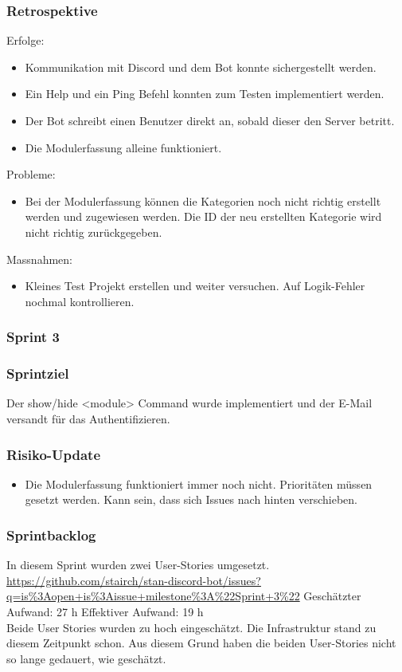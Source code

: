 \documentclass[a4paper, table]{article}
\begin{document}
\subsubsection*{Retrospektive}
Erfolge:
\begin{itemize}
    \item Kommunikation mit Discord und dem Bot konnte sichergestellt werden.
    \item Ein Help und ein Ping Befehl konnten zum Testen implementiert werden.
    \item Der Bot schreibt einen Benutzer direkt an, sobald dieser den Server betritt.
    \item Die Modulerfassung alleine funktioniert.
\end{itemize}
Probleme:
\begin{itemize}
    \item Bei der Modulerfassung können die Kategorien noch nicht richtig erstellt werden und zugewiesen werden.
    Die ID der neu erstellten Kategorie wird nicht richtig zurückgegeben.
\end{itemize}
Massnahmen:
\begin{itemize}
    \item Kleines Test Projekt erstellen und weiter versuchen. Auf Logik-Fehler nochmal kontrollieren.
\end{itemize}
\newpage

\subsubsection{Sprint 3}
\subsubsection*{Sprintziel}
Der show/hide <module> Command wurde implementiert und der E-Mail versandt für das Authentifizieren.

\subsubsection*{Risiko-Update}
\begin{itemize}
    \item Die Modulerfassung funktioniert immer noch nicht.
    Prioritäten müssen gesetzt werden.
    Kann sein, dass sich Issues nach hinten verschieben.
\end{itemize}

\subsubsection*{Sprintbacklog}
In diesem Sprint wurden zwei User-Stories umgesetzt.\\
\url{https://github.com/stairch/stan-discord-bot/issues?q=is%3Aopen+is%3Aissue+milestone%3A%22Sprint+3%22}
\newline
Geschätzter Aufwand: 27 h
\newline
Effektiver Aufwand: 19 h\\
Beide User Stories wurden zu hoch eingeschätzt. 
Die Infrastruktur stand zu diesem Zeitpunkt schon.
Aus diesem Grund haben die beiden User-Stories nicht so lange gedauert, wie geschätzt.
\end{document}

